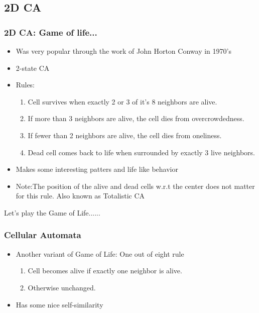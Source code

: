 \documentclass{beamer}
\begin{document}
\subsection{2D CA}
\begin{frame}
    \frametitle{2D CA: Game of life...}
    \begin{itemize}
        \item Was very popular through the work of John Horton Conway in 1970's
        \item 2-state CA
        \item Rules:
        \begin{enumerate}
            \item Cell survives when exactly 2 or 3 of it's 8 neighbors are alive.
            \item If more than 3 neighbors are alive, the cell dies from overcrowdedness.
            \item If fewer than 2 neighbors are alive, the cell dies from oneliness.
            \item Dead cell comes back to life when surrounded by exactly 3 live neighbors.  
        \end{enumerate}
        \item Makes some interesting patters and life like behavior 
        \item Note:The position of the alive and dead cells w.r.t the center does not matter for this rule. Also known as Totalistic CA
    \end{itemize}
\end{frame}

\begin{frame}
    \centering
    Let's play the Game of Life......
\end{frame}

\begin{frame}
    \frametitle{Cellular Automata}
    \begin{itemize}
        \item Another variant of Game of Life: One out of eight rule
        \begin{enumerate}
            \item Cell becomes alive if exactly one neighbor is alive.
            \item Otherwise unchanged.
        \end{enumerate}
        \item Has some nice self-similarity
    \end{itemize}
\end{frame}
\end{document}
